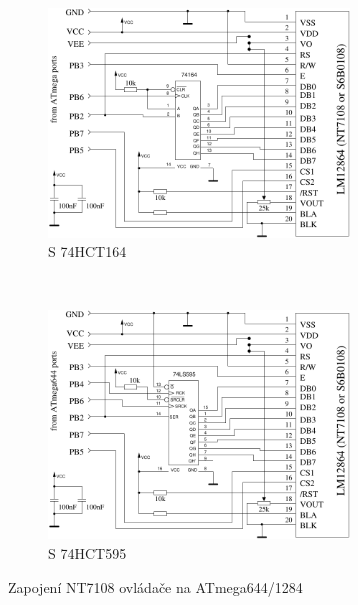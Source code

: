 \begin{figure}[H]
  \begin{subfigure}[b]{9cm}
    \centering
    \includegraphics[width=8cm]{../FIG/ST7108serial164_644.pdf}
    \caption{S 74HCT164}
  \end{subfigure}
  ~
  \begin{subfigure}[b]{9cm}
    \centering
    \includegraphics[width=8cm]{../FIG/ST7108serial595_644.pdf}
    \caption{S 74HCT595}
  \end{subfigure}
  \caption{Zapojení NT7108 ovládače na ATmega644/1284}
  \label{fig:NT7108lcd_644}
\end{figure}


